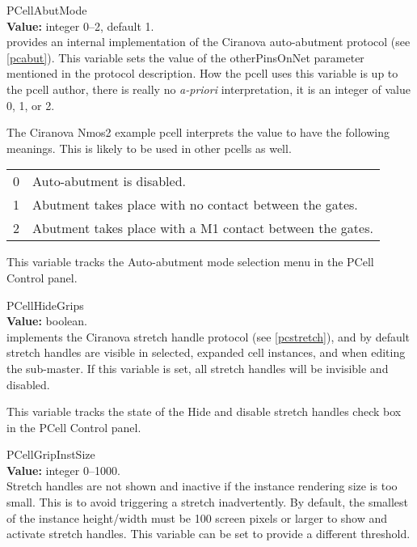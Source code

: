 \begin{description}
\item{\et PCellAbutMode}\\
{\bf Value:} integer 0--2, default 1.\\
{\Xic} provides an internal implementation of the Ciranova
auto-abutment protocol (see \ref{pcabut}).  This variable sets the
value of the {\et otherPinsOnNet} parameter mentioned in the protocol
description.  How the pcell uses this variable is up to the pcell
author, there is really no {\it a-priori} interpretation, it is an
integer of value 0, 1, or 2.

The Ciranova {\et Nmos2} example pcell interprets the value to have
the following meanings.  This is likely to be used in other pcells as
well.

\begin{tabular}{ll}\\
0 & Auto-abutment is disabled.\\
1 & Abutment takes place with no contact between the gates.\\
2 & Abutment takes place with a M1 contact between the gates.\\
\end{tabular}

This variable tracks the {\cb Auto-abutment mode} selection menu in
the {\cb PCell Control} panel.

\item{\et PCellHideGrips}\\
{\bf Value:} boolean.\\
{\Xic} implements the Ciranova stretch handle protocol (see
\ref{pcstretch}), and by default stretch handles are visible in
selected, expanded cell instances, and when editing the sub-master. 
If this variable is set, all stretch handles will be invisible and
disabled.

This variable tracks the state of the {\cb Hide and disable stretch
handles} check box in the {\cb PCell Control} panel.

\item{\et PCellGripInstSize}\\
{\bf Value:} integer 0--1000.\\
Stretch handles are not shown and inactive if the instance rendering
size is too small.  This is to avoid triggering a stretch
inadvertently.  By default, the smallest of the instance height/width
must be 100 screen pixels or larger to show and activate stretch
handles.  This variable can be set to provide a different threshold.
 

\end{description}
